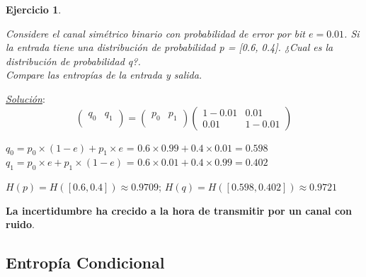 \documentclass{beamer}
\theoremstyle{plain}
\theoremstyle{example}
\newtheorem{ejercicio} [Ejercicio]{Ejercicio}
\theoremstyle{example}
\begin{document}
\begin{frame}  \small 

\begin{ejercicio} \label{ej:5.6}

Considere el canal simétrico binario con probabilidad de error por bit $e = 0.01$. Si la entrada tiene una distribución de probabilidad p = [0.6, 0.4]. ¿Cual es la distribución de probabilidad q?. \\
Compare las entropías de la entrada y salida.
\end{ejercicio}
\textit{\underline{Solución}}:\\

\[
\left( \begin{array}{lc}
            q_{0}       & q_{1}      \\
           \end{array}
    \right)  = \left( \begin{array}{lc}
            p_{0}       & p_{1}      \\
           \end{array}
    \right) \left( \begin{array}{cc}
           1-0.01       & 0.01      \\
            0.01    & 1-0.01      
           \end{array}
    \right)    
\]
\begin{center}
$q_0	= p_0 \times (1 - e) + p_1 \times e$  = $0.6 \times 0.99 + 0.4 \times 0.01=0.598$ \\
$q_1	= p_0 \times e  + p_1 \times (1 - e)$ = $0.6 \times 0.01 + 0.4 \times 0.99=0.402$
\end{center}

\begin{center}
$H(p) = H([0.6,0.4])	\approx  0.9709$;  $H(q) = H([0.598,0.402])	\approx  0.9721$
\end{center}

\textbf{La incertidumbre ha crecido a la hora de transmitir por un canal con ruido}.
\end{frame} 



\subsection{Entropía Condicional}
\end{document}
